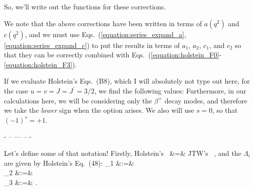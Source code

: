 

So, we'll write out the functions for these corrections.  
\unskip
\unskip
\unskip

We note that the above corrections have been written in terms of $a(q^2)$ and $c(q^2)$, and we must use Eqs.~(\ref{equation:series_expand_a}, \ref{equation:series_expand_c}) to put the results in terms of $a_1$,  $a_2$, $c_1$, and $c_2$ so that they can be correctly combined with Eqs.~(\ref{equation:holstein_F0}-\ref{equation:holstein_F3}).

If we evaluate Holstein's Eqs.~(B8), which I will absolutely not type out here, for the case $u=v=J=J^\prime=3/2$, we find the following values:
\unskip  %
Furthermore, in our calculations here, we will be considering only the $\beta^+$ decay modes, and therefore we take the \emph{lower} sign when the option arises.  We also will use $s=0$, so that $(-1)^s = +1$.


- -- --- -- - 

Let's define some of that notation!
Firstly, 
\bea
\textrm{Holstein's \,}  &=& \textrm{JTW's \,} ,
\label{eq:nequalsj}
\eea
and the 
$\Lambda_i$ are given by Holstein's Eq.~(48):
\bea
    \Lambda_1   &:=& \LambdaOne   
    \label{eq:lambda1} \\
    \Lambda_2   &:=& \LambdaTwo 
    \label{eq:lambda2} \\
    \Lambda_3   &:=& \LambdaThree .
    \label{eq:lambda3}
\eea

